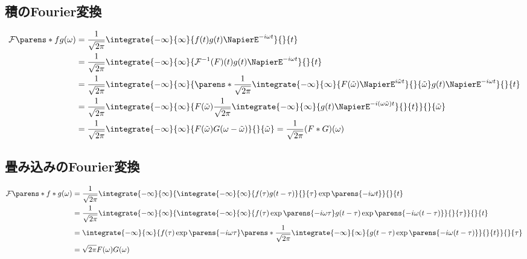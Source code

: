         \subsection{積のFourier変換}
            \begin{align*}
                \FT{fg}(\omega) &= \frac{1}{\sqrt{2\pi}}\integrate{-\infty}{\infty}{f(t)g(t)\NapierE^{-i\omega t}}{}{t} \\
                &= \frac{1}{\sqrt{2\pi}}\integrate{-\infty}{\infty}{\mathcal{F}^{-1}(F)(t)g(t)\NapierE^{-i\omega t}}{}{t} \\
                &= \frac{1}{\sqrt{2\pi}}\integrate{-\infty}{\infty}{\parens*{\frac{1}{\sqrt{2\pi}}\integrate{-\infty}{\infty}{F(\tilde{\omega})\NapierE^{i\tilde{\omega}t}}{}{\tilde{\omega}}}g(t)\NapierE^{-i\omega t}}{}{t} \\
                &= \frac{1}{\sqrt{2\pi}}\integrate{-\infty}{\infty}{F(\tilde{\omega})\frac{1}{\sqrt{2\pi}}\integrate{-\infty}{\infty}{g(t)\NapierE^{-i(\omega\tilde{\omega})t}}{}{t}}{}{\tilde{\omega}} \\
                &= \frac{1}{\sqrt{2\pi}}\integrate{-\infty}{\infty}{F(\tilde{\omega})G(\omega-\tilde{\omega})}{}{\tilde{\omega}} = \frac{1}{\sqrt{2\pi}}(F*G)(\omega)
            \end{align*}
        \subsection{畳み込みのFourier変換}
            \begin{align*}
                \FT{f*g}(\omega) &= \frac{1}{\sqrt{2\pi}}\integrate{-\infty}{\infty}{\integrate{-\infty}{\infty}{f(\tau)g(t-\tau)}{}{\tau}\exp\parens{-i\omega t}}{}{t} \\
                &= \frac{1}{\sqrt{2\pi}}\integrate{-\infty}{\infty}{\integrate{-\infty}{\infty}{f(\tau)\exp\parens{-i\omega\tau}g(t-\tau)\exp\parens{-i\omega (t-\tau)}}{}{\tau}}{}{t} \\
                &= \integrate{-\infty}{\infty}{f(\tau)\exp\parens{-i\omega\tau}\parens*{\frac{1}{\sqrt{2\pi}}\integrate{-\infty}{\infty}{g(t-\tau)\exp\parens{-i\omega (t-\tau)}}{}{t}}}{}{\tau} \\
                &= \sqrt{2\pi}F(\omega)G(\omega)
            \end{align*}
